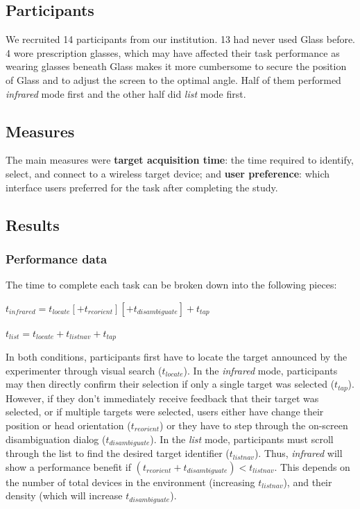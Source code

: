 \subsection{Participants}
We recruited 14 participants from our institution. 13 had never used Glass before. 4 wore prescription glasses, which may have affected their task performance as wearing glasses beneath Glass makes it more cumbersome to secure the position of Glass and to adjust the screen to the optimal angle. Half of them performed {\em infrared} mode first and the other half did {\em list} mode first.

\subsection{Measures}
The main measures were {\bf target acquisition time}: the time required to identify, select, and connect to a wireless target device; and {\bf user preference}: which interface users preferred for the task after completing the study.

\subsection{Results}
\subsubsection{Performance data}
The time to complete each task can be broken down into the following pieces:

$t_{infrared}=t_{locate}[+t_{reorient}][+t_{disambiguate}]+t_{tap}$

$t_{list}=t_{locate}+t_{listnav}+t_{tap}$

In both conditions, participants first have to locate the target announced by the experimenter through visual search ($t_{locate}$). In the {\em infrared} mode, participants may then directly confirm their selection if only a single target was selected ($t_{tap}$). However, if they don't immediately receive feedback that their target was selected, or if multiple targets were selected, users either have change their position or head orientation ($t_{reorient}$) or they have to step through the on-screen disambiguation dialog ($t_{disambiguate}$). In the {\em list} mode, participants must scroll through the list to find the desired target identifier ($t_{listnav}$).
Thus, {\em infrared} will show a performance benefit if $(t_{reorient}+t_{disambiguate})<t_{listnav}$. This depends on the number of total devices in the environment (increasing $t_{listnav}$), and their density (which will increase $t_{disambiguate}$). 

